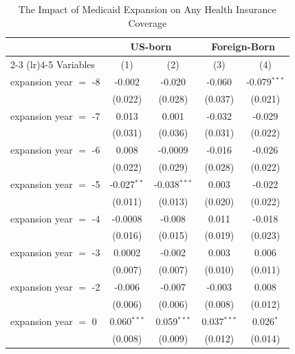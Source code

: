 
\begin{table}[htbp]
   \caption{The Impact of Medicaid Expansion on Any Health Insurance Coverage }
   \centering
   \small
   \renewcommand*{\arraystretch}{0.5}
   \begin{tabular}{lcccc}
      \tabularnewline \midrule \midrule
       & \multicolumn{2}{c}{US-born} & \multicolumn{2}{c}{Foreign-Born} \\ \cmidrule(lr){2-3} \cmidrule(lr){4-5}
      Variables             & (1)           & (2)            & (3)           & (4)\\  
      \midrule 
      expansion year $=$ -8 & -0.002        & -0.020         & -0.060        & -0.079$^{***}$\\   
                            & (0.022)       & (0.028)        & (0.037)       & (0.021)\\   
      expansion year $=$ -7 & 0.013         & 0.001          & -0.032        & -0.029\\   
                            & (0.031)       & (0.036)        & (0.031)       & (0.022)\\   
      expansion year $=$ -6 & 0.008         & -0.0009        & -0.016        & -0.026\\   
                            & (0.022)       & (0.029)        & (0.028)       & (0.022)\\   
      expansion year $=$ -5 & -0.027$^{**}$ & -0.038$^{***}$ & 0.003         & -0.022\\   
                            & (0.011)       & (0.013)        & (0.020)       & (0.022)\\   
      expansion year $=$ -4 & -0.0008       & -0.008         & 0.011         & -0.018\\   
                            & (0.016)       & (0.015)        & (0.019)       & (0.023)\\   
      expansion year $=$ -3 & 0.0002        & -0.002         & 0.003         & 0.006\\   
                            & (0.007)       & (0.007)        & (0.010)       & (0.011)\\   
      expansion year $=$ -2 & -0.006        & -0.007         & -0.003        & 0.008\\   
                            & (0.006)       & (0.006)        & (0.008)       & (0.012)\\   
      expansion year $=$ 0  & 0.060$^{***}$ & 0.059$^{***}$  & 0.037$^{***}$ & 0.026$^{*}$\\   
                            & (0.008)       & (0.009)        & (0.012)       & (0.014)\\   

\end{tabular}
\end{table}
